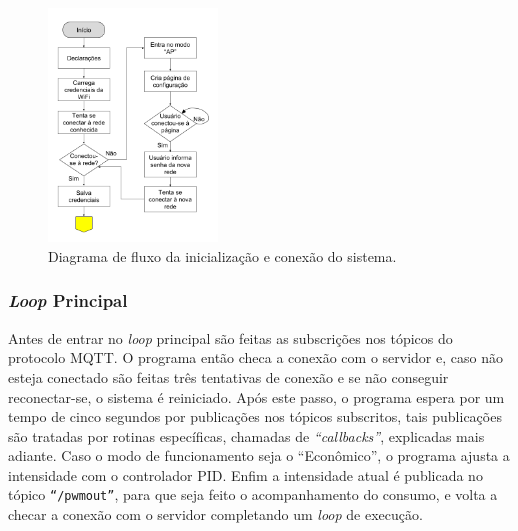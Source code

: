 \begin{figure}[ht]
    \begin{center}
    \includegraphics[width=0.4\textwidth]{figuras/flux_init.png}
    \end{center}
    \caption[Diagrama de fluxo da inicialização e conexão do sistema.]{Diagrama de fluxo da inicialização e conexão do sistema.}
    \label{finit}
\end{figure}

\subsubsection{\textit{Loop} Principal}

Antes de entrar no \textit{loop} principal são feitas as subscrições nos tópicos do protocolo MQTT. O programa então checa a conexão com o servidor e, caso não esteja conectado são feitas três tentativas de conexão e se não conseguir reconectar-se, o sistema é reiniciado. Após este passo, o programa espera por um tempo de cinco segundos por publicações nos tópicos subscritos, tais publicações são tratadas por rotinas específicas, chamadas de \textit{``callbacks''}, explicadas mais adiante. Caso o modo de funcionamento seja o ``Econômico'', o programa ajusta a intensidade com o controlador PID. Enfim a intensidade atual é publicada no tópico \texttt{``/pwmout''}, para que seja feito o acompanhamento do consumo, e volta a checar a conexão com o servidor completando um \textit{loop} de execução.

